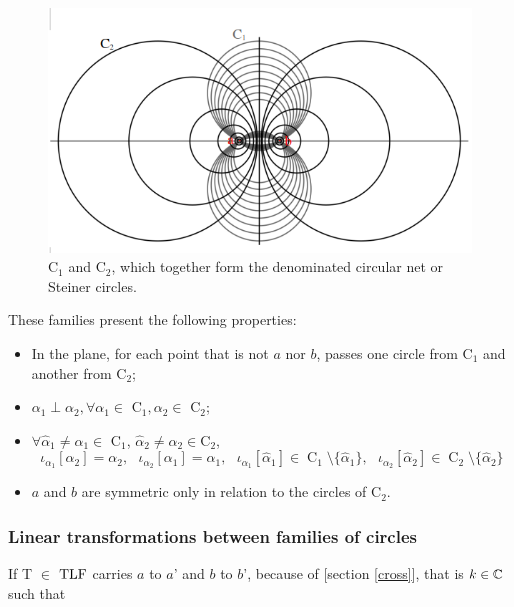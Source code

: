 \begin{figure}[H]
    \centering
    \includegraphics[scale=0.35]{steiner.png}
    \caption{C$_1$ and C$_2$, which together form the denominated circular net or Steiner circles.}
    \label{fig:steiner}
\end{figure}

These families present the following properties:
\begin{itemize}
    \item In the plane, for each point that is not $a$ nor $b$, passes one circle from C$_1$ and another from C$_2$;
    \item $\alpha_1 \perp \alpha_2, \forall \alpha_1 \in$ C$_1,  \alpha_2 \in$ C$_2$;
    \item $\forall \hat{\alpha}_1 \neq \alpha_1 \in$ C$_1$, $\hat{\alpha}_2 \neq \alpha_2 \in $C$_2$,
    \begin{equation*}
    \iota_{\alpha_1}[\alpha_2] = \alpha_2,\text{  } \iota_{\alpha_2}[\alpha_1] = \alpha_1, \text{  } \iota_{\alpha_1}[\hat{\alpha}_1] \in \operatorname{C}_1\setminus{\{\hat{\alpha}_1\}}, \text{  } \iota_{\alpha_2}[\hat{\alpha}_2] \in \operatorname{C}_2\setminus{\{\hat{\alpha}_2\}}
    \end{equation*}
    \item $a$ and $b$ are symmetric only in relation to the circles of C$_2$.
\end{itemize}

\subsubsection{Linear transformations between families of circles}

If T $\in$ $\operatorname{TLF}$ carries $a$ to $a$' and $b$ to $b$', because of [section \ref{cross}], that is $k \in \mathbb{C}$ such that

